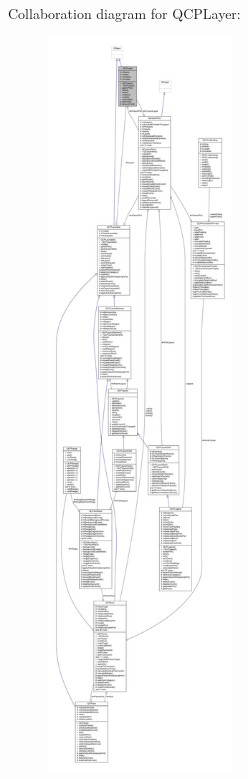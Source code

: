 Collaboration diagram for Q\+C\+P\+Layer\+:\nopagebreak
\begin{figure}[H]
\begin{center}
\leavevmode
\includegraphics[height=550pt]{class_q_c_p_layer__coll__graph}
\end{center}
\end{figure}
